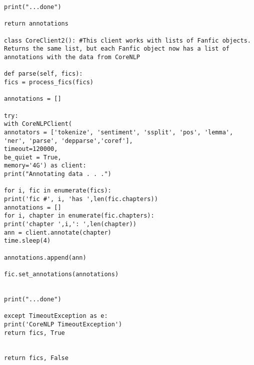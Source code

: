 \documentclass{pre-tfg}
\begin{document}
\begin{lstlisting}[style=consola]
print("...done")

return annotations

class CoreClient2(): #This client works with lists of Fanfic objects. Returns the same list, but each Fanfic object now has a list of annotations with the data from CoreNLP

def parse(self, fics):
fics = process_fics(fics)

annotations = []

try:
with CoreNLPClient(
annotators = ['tokenize', 'sentiment', 'ssplit', 'pos', 'lemma', 'ner', 'parse', 'depparse','coref'],
timeout=120000,
be_quiet = True,
memory='4G') as client:
print("Annotating data . . .")

for i, fic in enumerate(fics):
print('fic #', i, 'has ',len(fic.chapters))
annotations = []
for i, chapter in enumerate(fic.chapters):
print('chapter ',i,': ',len(chapter))
ann = client.annotate(chapter)
time.sleep(4)

annotations.append(ann)

fic.set_annotations(annotations)


print("...done")

except TimeoutException as e:
print('CoreNLP TimeoutException')
return fics, True


return fics, False

\end{lstlisting}

\cleardoublepage
\end{document}
